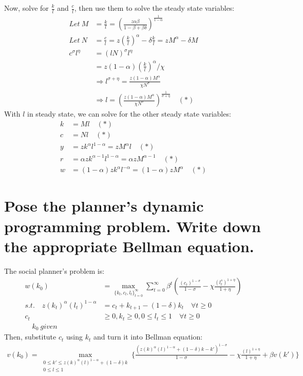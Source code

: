 \documentclass{article}
\begin{document}
 Now, solve for $\frac{k}{l}$ and $\frac{c}{l}$, then use them to solve the steady state variables:
  \begin{equation}
    \begin{split}
    Let\: M &= \frac{k}{l}=\left(\frac{z\alpha \beta}{1-\beta +\beta \delta}\right)^{\frac{1}{1-\alpha}} \\
    Let\: N &=\frac{c}{l}=z(\frac{k}{l})^{\alpha}-\delta \frac{k}{l}=zM^{\alpha}-\delta M \\
    c^{\sigma} l^{\eta} &= (lN)^{\sigma}l^{\eta}\\
    &= z(1-\alpha)(\frac{k}{l})^{\alpha}/\chi\\
    &\Rightarrow l^{\sigma+\eta} =\frac{z(1-\alpha)M^{\alpha}}{\chi N^{\sigma}}\\ &\Rightarrow l=\left(\frac{z(1-\alpha)M^{\alpha}}{\chi N^{\sigma}}\right)^{\frac{1}{\sigma+\eta}} \quad (*)
    \end{split}
    \end{equation}
With $l$ in steady state, we can solve for the other steady state variables:
  \begin{equation}
    \begin{split}
    k&=Ml\quad (*)\\
    c&=Nl\quad (*)\\
    y&=zk^{\alpha}l^{1-\alpha}=zM^{\alpha}l\quad (*)\\
    r&=\alpha zk^{\alpha-1}l^{1-\alpha}=\alpha zM^{\alpha -1}\quad (*)\\
    w&=(1-\alpha)zk^{\alpha}l^{-\alpha}=(1-\alpha)zM^{\alpha} \quad (*)
    \end{split}
    \end{equation}
 \section{Pose the planner’s dynamic programming problem. Write down the appropriate
Bellman equation.}
The social planner's problem is:
\begin{equation}
\begin{split}
w(k_{0}) &= \max\limits_{\{k_{t}, c_{t}, l_{t}\}^{\infty}_{t=0}} \sum_{t=0}^{\infty} \beta^t(\frac{(c_{t})^{1-\sigma}}{1-\sigma}-\chi \frac{(l^s_{t})^{1+\eta}}{1+\eta}) \\
    s.t. \quad z(k_t)^{\alpha}(l_t)^{1-\alpha} &= c_t+k_{t+1}-(1-\delta)k_t \quad \forall t\geq0\\
    c_t &\geq 0, k_t \geq 0, 0 \leq l_t \leq 1 \quad \forall t\geq0\\
     \quad {k}_{0}\:given
\end{split}
\end{equation}
Then, substitute $c_t$ using $k_t$ and turn it into Bellman equation:
\begin{equation}
\begin{split}
v(k_0) = \max\limits_{\begin{smallmatrix}0\leq k' \leq z(k)^{\alpha}(l)^{1-\alpha}+ (1-\delta)k\\ 0\leq l \leq 1\end{smallmatrix}} \{\frac{(z(k)^{\alpha}(l)^{1-\alpha}+ (1-\delta)k-k')^{1-\sigma}}{1-\sigma}-\chi \frac{(l)^{1+\eta}}{1+\eta}+\beta v(k')\}
\end{split}
\end{equation}
\end{document}

